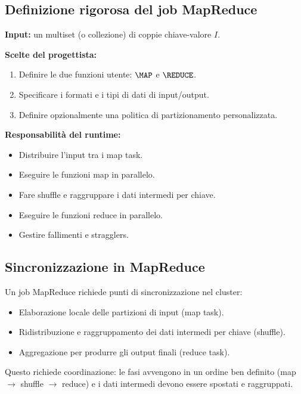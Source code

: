 \subsection{Definizione rigorosa del job MapReduce}

\textbf{Input:} un multiset (o collezione) di coppie chiave-valore $I$.

\textbf{Scelte del progettista:}
\begin{enumerate}
  \item Definire le due funzioni utente: $\MAP$ e $\REDUCE$.
  \item Specificare i formati e i tipi di dati di input/output.
  \item Definire opzionalmente una politica di partizionamento personalizzata.
\end{enumerate}

\textbf{Responsabilità del runtime:}
\begin{itemize}
  \item Distribuire l'input tra i map task.
  \item Eseguire le funzioni map in parallelo.
  \item Fare shuffle e raggruppare i dati intermedi per chiave.
  \item Eseguire le funzioni reduce in parallelo.
  \item Gestire fallimenti e stragglers.
\end{itemize}

\subsection{Sincronizzazione in MapReduce}

Un job MapReduce richiede punti di sincronizzazione nel cluster:
\begin{itemize}
  \item Elaborazione locale delle partizioni di input (map task).
  \item Ridistribuzione e raggruppamento dei dati intermedi per chiave (shuffle).
  \item Aggregazione per produrre gli output finali (reduce task).
\end{itemize}

Questo richiede coordinazione: le fasi avvengono in un ordine ben definito
(map $\to$ shuffle $\to$ reduce) e i dati intermedi devono essere spostati
e raggruppati.


